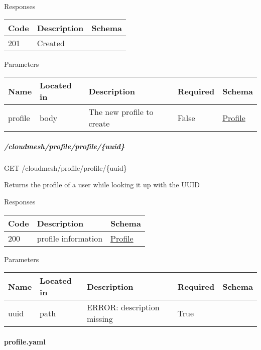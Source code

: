 \documentclass[9pt,]{article}
\let\oldparagraph\paragraph
\renewcommand{\paragraph}[1]{\oldparagraph{#1}\mbox{}}
\let\oldsubparagraph\subparagraph
\renewcommand{\subparagraph}[1]{\oldsubparagraph{#1}\mbox{}}
\begin{document}
Responses

\begin{longtable}[]{@{}lll@{}}
\toprule
Code & Description & Schema\tabularnewline
\midrule
\endhead
201 & Created &\tabularnewline
\bottomrule
\end{longtable}

Parameters

\begin{longtable}[]{@{}lllll@{}}
\toprule
Name & Located in & Description & Required & Schema\tabularnewline
\midrule
\endhead
profile & body & The new profile to create & False &
\protect\hyperlink{profile}{Profile}\tabularnewline
\bottomrule
\end{longtable}

\hypertarget{cloudmeshprofileprofileuuid}{%
\subparagraph{/cloudmesh/profile/profile/\{uuid\}}\label{cloudmeshprofileprofileuuid}}

GET /cloudmesh/profile/profile/\{uuid\}

Returns the profile of a user while looking it up with the UUID

Responses

\begin{longtable}[]{@{}lll@{}}
\toprule
Code & Description & Schema\tabularnewline
\midrule
\endhead
200 & profile information &
\protect\hyperlink{profile}{Profile}\tabularnewline
\bottomrule
\end{longtable}

Parameters

\begin{longtable}[]{@{}lllll@{}}
\toprule
Name & Located in & Description & Required & Schema\tabularnewline
\midrule
\endhead
uuid & path & ERROR: description missing & True &\tabularnewline
\bottomrule
\end{longtable}

\hypertarget{profile.yaml}{%
\paragraph{profile.yaml}\label{profile.yaml}}
\end{document}

